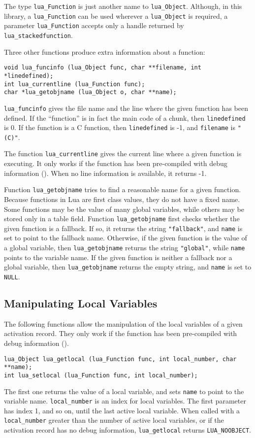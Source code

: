 The type \verb'lua_Function' is just another name
to \verb'lua_Object'.
Although, in this library,
a \verb'lua_Function' can be used wherever a \verb'lua_Object' is required,
a parameter \verb'lua_Function' accepts only a handle returned by
\verb'lua_stackedfunction'.

Three other functions produce extra information about a function:
\begin{verbatim}
void lua_funcinfo (lua_Object func, char **filename, int *linedefined);
int lua_currentline (lua_Function func);
char *lua_getobjname (lua_Object o, char **name);
\end{verbatim}
\verb'lua_funcinfo' gives the file name and the line where the
given function has been defined.
If the ``function'' is in fact the main code of a chunk,
then \verb'linedefined' is 0.
If the function is a C function,
then \verb'linedefined' is -1, and \verb'filename' is \verb'"(C)"'.

The function \verb'lua_currentline' gives the current line where
a given function is executing.
It only works if the function has been pre-compiled with debug
information ().
When no line information is available, it returns -1.

Function \verb'lua_getobjname' tries to find a reasonable name for
a given function.
Because functions in Lua are first class values,
they do not have a fixed name.
Some functions may be the value of many global variables,
while others may be stored only in a table field.
Function \verb'lua_getobjname' first checks whether the given
function is a fallback.
If so, it returns the string \verb'"fallback"',
and \verb'name' is set to point to the fallback name.
Otherwise, if the given function is the value of a global variable,
then \verb'lua_getobjname' returns the string \verb'"global"',
while \verb'name' points to the variable name.
If the given function is neither a fallback nor a global variable,
then \verb'lua_getobjname' returns the empty string,
and \verb'name' is set to \verb'NULL'.

\subsection{Manipulating Local Variables}

The following functions allow the manipulation of the
local variables of a given activation record.
They only work if the function has been pre-compiled with debug
information ().
\begin{verbatim}
lua_Object lua_getlocal (lua_Function func, int local_number, char **name);
int lua_setlocal (lua_Function func, int local_number);
\end{verbatim}
The first one returns the value of a local variable,
and sets \verb'name' to point to the variable name.
\verb'local_number' is an index for local variables.
The first parameter has index 1, and so on, until the
last active local variable.
When called with a \verb'local_number' greater than the
number of active local variables,
or if the activation record has no debug information,
\verb'lua_getlocal' returns \verb'LUA_NOOBJECT'.

